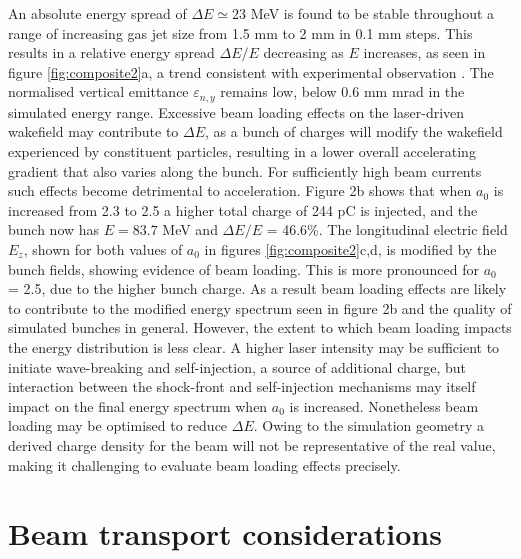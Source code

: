 \documentclass[preprint,5p,times,sort&compress]{elsarticle}
\begin{document}
An absolute energy spread of $\Delta E \simeq 23$ MeV is found to be stable throughout a range of increasing gas jet size from 1.5 mm to 2 mm in 0.1 mm steps. This results in a relative energy spread $\Delta E / E $ decreasing as $E$ increases, as seen in figure \ref{fig:composite2}a, a trend consistent with experimental observation \cite{Buck2013}. The normalised vertical emittance $\varepsilon_{n,y}$ remains low, below 0.6 mm mrad in the simulated energy range. Excessive beam loading effects on the laser-driven wakefield may contribute to $\Delta E$, as a bunch of charges will modify the wakefield experienced by constituent particles, resulting in a lower overall accelerating gradient that also varies along the bunch. For sufficiently high beam currents such effects become detrimental to acceleration. Figure 2b shows that when $a_0$ is increased from 2.3 to 2.5 a higher total charge of 244 pC is injected, and the bunch now has $E = 83.7$ MeV and $\Delta E / E$ = 46.6\%. The longitudinal electric field $E_z$, shown for both values of $a_0$ in figures \ref{fig:composite2}c,d, is modified by the bunch fields, showing evidence of beam loading. This is more pronounced for $a_0$ = 2.5, due to the higher bunch charge. As a result beam loading effects are likely to contribute to the modified energy spectrum seen in figure 2b and the quality of simulated bunches in general. However, the extent to which beam loading impacts the energy distribution is less clear. A higher laser intensity may be sufficient to initiate wave-breaking and self-injection, a source of additional charge, but interaction between the shock-front and self-injection mechanisms may itself impact on the final energy spectrum when $a_0$ is increased. Nonetheless beam loading may be optimised to reduce $\Delta E$. Owing to the simulation geometry a derived charge density for the beam will not be representative of the real value, making it challenging to evaluate beam loading effects precisely.
\section{Beam transport considerations}
\end{document}
